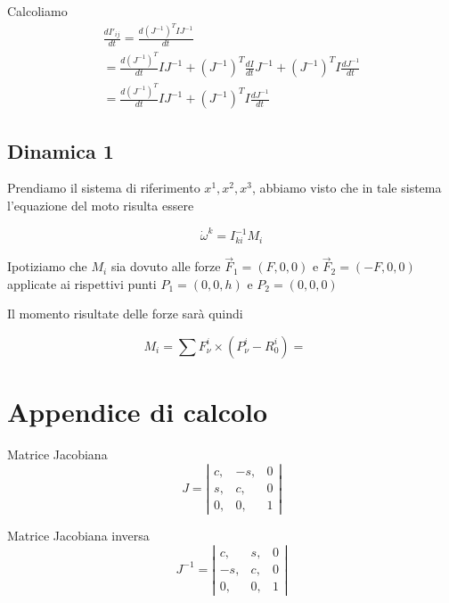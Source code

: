 \documentclass[a4paper,11pt]{article}
\begin{document}
Calcoliamo
\begin{eqnarray*}
	\frac{d I'_{ij}}{dt} = \frac{d (J^{-1})^T I J^{-1}}{dt}
\\
	= \frac{d (J^{-1})^T}{dt} I J^{-1} + (J^{-1})^T \frac{d I}{dt} J^{-1} + (J^{-1})^T I \frac{d J^{-1}}{dt}
\\
	=  \frac{d (J^{-1})^T}{dt} I J^{-1} + (J^{-1})^T I \frac{d J^{-1}}{dt}
\end{eqnarray*}

\subsection{Dinamica 1}

Prendiamo il sistema di riferimento $ x^1, x^2, x^3 $, abbiamo visto che in tale sistema l'equazione del moto 
risulta essere

\[
	\dot \omega^k = I_ {ki}^{-1} M_i
\]

Ipotiziamo che $ M_i $ sia dovuto alle forze $ \vec F_1 = (F, 0, 0) $ e $ \vec F_2 = (-F, 0, 0) $ applicate ai rispettivi punti
$P_1 = (0, 0, h) $ e $ P_2 = (0, 0, 0) $

Il momento risultate delle forze sarà quindi 

\begin{equation}
M_i = \sum F_\nu^i \times (P_\nu^i - R_0^i) =
\
\begin{array}{lll}

\end{array}
\end{equation}

\section{Appendice di calcolo}
Matrice Jacobiana
\begin{equation}
	J =
\left|
\begin{array}{lll}
	c,	&	-s,	&	0
	\\
	s,	&	c,	&	0
	\\
	0,	&	0,	&	1
\end{array}
\right|
\end{equation}

Matrice Jacobiana inversa
\begin{equation}
	J^{-1} =
\left|
\begin{array}{lll}
	c,	&	s,	&	0
	\\
	-s,	&	c,	&	0
	\\
	0,	&	0,	&	1
\end{array}
\right|
\end{equation}
\end{document}
